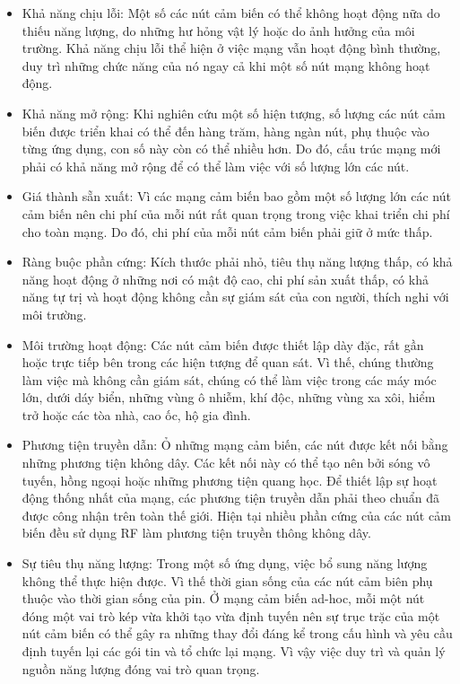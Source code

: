 \documentclass{report}
\begin{document}
\begin{itemize}
\item Khả năng chịu lỗi: Một số các nút cảm biến có thể không hoạt động nữa do thiếu năng lượng,
do những hư hỏng vật lý hoặc do ảnh hưởng của môi trường. Khả năng chịu lỗi thể hiện ở việc
mạng vẫn hoạt động bình thường, duy trì những chức năng của nó ngay cả khi một số nút
mạng không hoạt động.
\item Khả năng mở rộng: Khi nghiên cứu một số hiện tượng, số lượng các nút cảm biến được triển
khai có thể đến hàng trăm, hàng ngàn nút, phụ thuộc vào từng ứng dụng, con số này còn có
thể nhiều hơn. Do đó, cấu trúc mạng mới phải có khả năng mở rộng để có thể làm việc với số
lượng lớn các nút.
\item Giá thành sẵn xuất: Vì các mạng cảm biến bao gồm một số lượng lớn các nút cảm biến nên
chi phí của mỗi nút rất quan trọng trong việc khai triển chi phí cho toàn mạng. Do đó, chi phí
của mỗi nút cảm biến phải giữ ở mức thấp.
\item Ràng buộc phần cứng: Kích thước phải nhỏ, tiêu thụ năng lượng thấp, có khả năng hoạt
động ở những nơi có mật độ cao, chi phí sản xuất thấp, có khả năng tự trị và hoạt động không
cần sự giám sát của con người, thích nghi với môi trường.
\item Môi trường hoạt động: Các nút cảm biến được thiết lập dày đặc, rất gần hoặc trực tiếp bên
trong các hiện tượng để quan sát. Vì thế, chúng thường làm việc mà không cần giám sát, chúng
có thể làm việc trong các máy móc lớn, dưới dáy biển, những vùng ô nhiễm, khí độc, những
vùng xa xôi, hiểm trở hoặc các tòa nhà, cao ốc, hộ gia đình.
\item Phương tiện truyền dẫn: Ỏ những mạng cảm biến, các nút được kết nối bằng những phương
tiện không dây. Các kết nối này có thể tạo nên bởi sóng vô tuyến, hồng ngoại hoặc những
phương tiện quang học. Để thiết lập sự hoạt động thống nhất của mạng, các phương tiện
truyền dẫn phải theo chuẩn đã được công nhận trên toàn thế giới. Hiện tại nhiều phần cứng
của các nút cảm biến đều sử dụng RF làm phương tiện truyền thông không dây.
\item Sự tiêu thụ năng lượng: Trong một số ứng dụng, việc bổ sung năng lượng không thể thực
hiện được. Vì thế thời gian sống của các nút cảm biên phụ thuộc vào thời gian sống của pin.
Ở mạng cảm biến ad-hoc, mỗi một nút đóng một vai trò kép vừa khởi tạo vừa định tuyến nên
sự trục trặc của một nút cảm biến có thể gây ra những thay đổi đáng kể trong cấu hình và yêu
cầu định tuyến lại các gói tin và tổ chức lại mạng. Vì vậy việc duy trì và quản lý nguồn năng
lượng đóng vai trò quan trọng.
\end{itemize}
\end{document}

